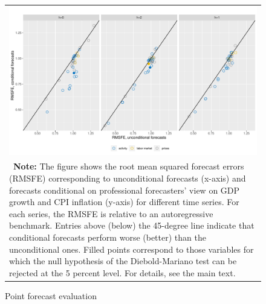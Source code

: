 \documentclass[notitlepage,a4paper,12pt]{article}
\begin{document}
\begin{figure}[htp!] \centering
    \caption{Point forecast evaluation \label{fig:rmsfe}}
    \footnotesize
    \begin{tabular}{p{16cm}}
        \multicolumn{1}{c}{\includegraphics*[scale = 0.6]{../figures/fig_eval_rmsfe.pdf}} \\
        {
        \footnotesize \textbf{Note:} The figure shows the root mean squared forecast errors (RMSFE)  corresponding to unconditional forecasts (x-axis) and forecasts conditional on professional forecasters' view on GDP growth and CPI inflation (y-axis) for different time series. For each series, the RMSFE is relative to an autoregressive benchmark. Entries above (below) the 45-degree line indicate that conditional forecasts perform worse (better) than the unconditional ones. Filled points correspond to those variables for which the null hypothesis of the Diebold-Mariano test can be rejected at the 5 percent level. For details, see the main text. 
        }
        \end{tabular}
    \newline
    \normalsize
\end{figure}
\end{document}
